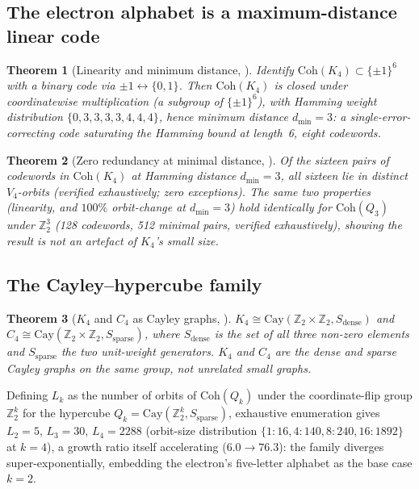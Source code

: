 \documentclass[11pt,a4paper]{article}
\theoremstyle{plain}
\newtheorem{theorem}{Theorem}[section]
\theoremstyle{definition}
\theoremstyle{remark}
\begin{document}
\subsection{The electron alphabet is a maximum-distance linear code}

\begin{theorem}[Linearity and minimum distance, \cite{DL03}]
\label{thm:DL03_code}
Identify $\mathrm{Coh}(K_4)\subset\{\pm1\}^6$ with a binary code via $\pm1\leftrightarrow\{0,1\}$. Then $\mathrm{Coh}(K_4)$ is closed under coordinatewise multiplication (a subgroup of $\{\pm1\}^6$), with Hamming weight distribution $\{0,3,3,3,3,4,4,4\}$, hence minimum distance $d_{\min}=3$: a single-error-correcting code saturating the Hamming bound at length~6, eight codewords.
\end{theorem}

\begin{theorem}[Zero redundancy at minimal distance, \cite{DL03}]
\label{thm:DL03_phonemic}
Of the sixteen pairs of codewords in $\mathrm{Coh}(K_4)$ at Hamming distance $d_{\min}=3$, all sixteen lie in distinct $V_4$-orbits (verified exhaustively; zero exceptions). The same two properties (linearity, and $100\%$ orbit-change at $d_{\min}=3$) hold identically for $\mathrm{Coh}(Q_3)$ under $\mathbb{Z}_2^3$ (128 codewords, 512 minimal pairs, verified exhaustively), showing the result is not an artefact of $K_4$'s small size.
\end{theorem}

\subsection{The Cayley--hypercube family}

\begin{theorem}[\texorpdfstring{$K_4$}{K4} and \texorpdfstring{$C_4$}{C4} as Cayley graphs, \cite{DL03}]
\label{thm:DL03_cayley}
$K_4\cong\mathrm{Cay}(\mathbb{Z}_2\times\mathbb{Z}_2,S_{\mathrm{dense}})$ and $C_4\cong\mathrm{Cay}(\mathbb{Z}_2\times\mathbb{Z}_2,S_{\mathrm{sparse}})$, where $S_{\mathrm{dense}}$ is the set of all three non-zero elements and $S_{\mathrm{sparse}}$ the two unit-weight generators. $K_4$ and $C_4$ are the dense and sparse Cayley graphs on the same group, not unrelated small graphs.
\end{theorem}

Defining $L_k$ as the number of orbits of $\mathrm{Coh}(Q_k)$ under the coordinate-flip group $\mathbb{Z}_2^k$ for the hypercube $Q_k=\mathrm{Cay}(\mathbb{Z}_2^k,S_{\mathrm{sparse}})$, exhaustive enumeration gives $L_2=5$, $L_3=30$, $L_4=2288$ (orbit-size distribution $\{1{:}16,4{:}140,8{:}240,16{:}1892\}$ at $k=4$), a growth ratio itself accelerating ($6.0\to76.3$): the family diverges super-exponentially, embedding the electron's five-letter alphabet as the base case $k=2$.
\end{document}
